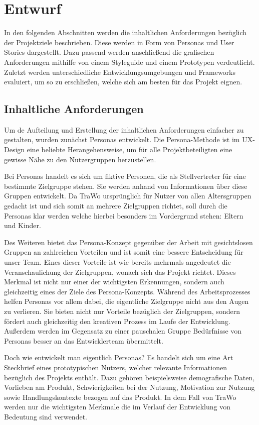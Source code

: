 \chapter{Entwurf}\label{ch:entwurf}
In den folgenden Abschnitten werden die inhaltlichen Anforderungen bezüglich der Projektziele beschrieben. Diese werden in Form von Personas und User Stories dargestellt. Dazu passend werden anschließend die grafischen Anforderungen mithilfe von einem Styleguide und einem Prototypen verdeutlicht. Zuletzt werden unterschiedliche Entwicklungsumgebungen und Frameworks evaluiert, um so zu erschließen, welche sich am besten für das Projekt eignen.

\section{Inhaltliche Anforderungen}\label{inhaltliche_anforderungen}
Um de Aufteilung und Erstellung der inhaltlichen Anforderungen einfacher zu gestalten, wurden zunächst Personas entwickelt. Die Persona-Methode ist im UX-Design eine beliebte Herangehensweise, um für alle Projektbeteiligten eine gewisse Nähe zu den Nutzergruppen herzustellen.

Bei Personas handelt es sich um fiktive Personen, die als Stellvertreter für eine bestimmte Zielgruppe stehen. Sie werden anhand von Informationen über diese Gruppen entwickelt. Da TraWo ursprünglich für Nutzer von allen Altersgruppen gedacht ist und sich somit an mehrere Zielgruppen richtet, soll durch die Personas klar werden welche hierbei besonders im Vordergrund stehen: Eltern und Kinder.

Des Weiteren bietet das Persona-Konzept gegenüber der Arbeit mit gesichtslosen Gruppen an zahlreichen Vorteilen und ist somit eine bessere Entscheidung für unser Team. Eines dieser Vorteile ist wie bereits mehrmals angedeutet die Veranschaulichung der Zielgruppen, wonach sich das Projekt richtet. Dieses Merkmal ist nicht nur einer der wichtigsten Erkennungen, sondern auch gleichzeitig eines der Ziele des Persona-Konzepts. Während des Arbeitsprozesses helfen Personas vor allem dabei, die eigentliche Zielgruppe nicht aus den Augen zu verlieren. Sie bieten nicht nur Vorteile bezüglich der Zielgruppen, sondern fördert auch gleichzeitig den kreativen Prozess im Laufe der Entwicklung. Außerdem werden im Gegensatz zu einer pauschalen Gruppe Bedürfnisse von Personas besser an das Entwicklerteam übermittelt.

Doch wie entwickelt man eigentlich Personas? Es handelt sich um eine Art Steckbrief eines prototypischen Nutzers, welcher relevante Informationen bezüglich des Projekts enthält. Dazu gehören beispielsweise demografische Daten, Vorlieben am Produkt, Schwierigkeiten bei der Nutzung, Motivation zur Nutzung sowie Handlungskontexte bezogen auf das Produkt. In dem Fall von TraWo werden nur die wichtigsten Merkmale die im Verlauf der Entwicklung von Bedeutung sind verwendet.

